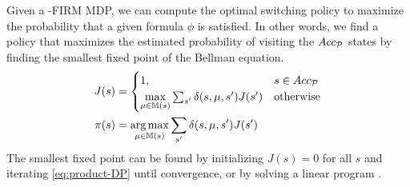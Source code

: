 \documentclass[conference]{IEEEtran}
\newcommand{\sofie}[1]{{\color{purple} [Sofie] #1}}
\begin{document}
Given a \DTL-FIRM MDP, we can compute the optimal switching policy to maximize the probability that a given formula $\phi$ is satisfied.  
%
%
In other words, we find a policy that maximizes the estimated probability of visiting the $Acc_{\mathcal{P}}$ states by finding the smallest fixed point of the Bellman equation.
\begin{align}
J(s) &= \begin{cases}
1, &  s \in Acc_\PA \\ 
\underset{\mu \in \mathbb{M}(s)}{\max} \sum_{s'} \delta(s,\mu,s')J(s') & \text{otherwise} 
\end{cases}  \label{eq:product-DP}\\
\pi(s) &= \underset{\mu \in \mathbb{M}(s)}{\arg \max} \sum_{s'} \delta(s,\mu,s')J(s')
\end{align}
The smallest fixed point can be  found by initializing $J(s) = 0$ for all $s$ and iterating \eqref{eq:product-DP} until convergence, or by solving a linear program \cite[Theorem 10.105]{Baier08}.
\end{document}
